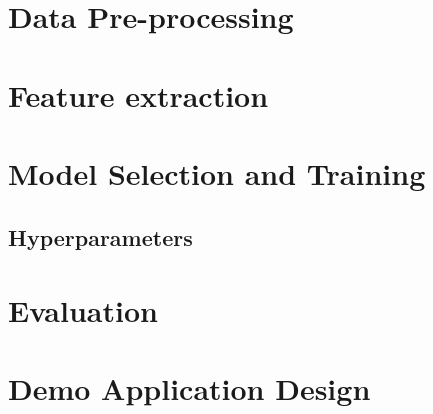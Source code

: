 \section{Data Pre-processing}

\section{Feature extraction}

\section{Model Selection and Training}
\subsection{Hyperparameters}

\section{Evaluation}

\section{Demo Application Design}
